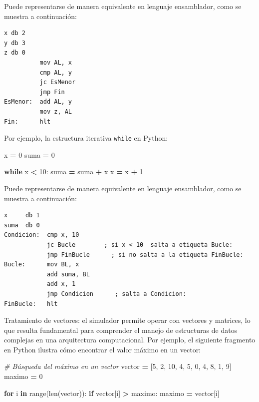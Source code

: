 \documentclass[12pt,oneside]{templates/unerthesis}
\newenvironment{Shaded}{\begin{snugshade}}{\end{snugshade}}
\newcommand{\BuiltInTok}[1]{#1}
\newcommand{\CommentTok}[1]{\textcolor[rgb]{0.56,0.35,0.01}{\textit{#1}}}
\newcommand{\ControlFlowTok}[1]{\textcolor[rgb]{0.13,0.29,0.53}{\textbf{#1}}}
\newcommand{\DecValTok}[1]{\textcolor[rgb]{0.00,0.00,0.81}{#1}}
\newcommand{\KeywordTok}[1]{\textcolor[rgb]{0.13,0.29,0.53}{\textbf{#1}}}
\newcommand{\NormalTok}[1]{#1}
\newcommand{\OperatorTok}[1]{\textcolor[rgb]{0.81,0.36,0.00}{\textbf{#1}}}
\begin{document}
Puede representarse de manera equivalente en lenguaje ensamblador, como se muestra a continuación:

\begin{lstlisting}
x db 2 
y db 3
z db 0
          mov AL, x
          cmp AL, y
          jc EsMenor
          jmp Fin
EsMenor:  add AL, y
          mov z, AL 
Fin:      hlt\end{lstlisting}

Por ejemplo, la estructura iterativa \texttt{while} en Python:

\begin{Shaded}
\begin{Highlighting}[]
\NormalTok{x }\OperatorTok{=} \DecValTok{0}
\NormalTok{suma }\OperatorTok{=} \DecValTok{0}

\ControlFlowTok{while}\NormalTok{ x }\OperatorTok{\textless{}} \DecValTok{10}\NormalTok{:}
\NormalTok{    suma }\OperatorTok{=}\NormalTok{ suma }\OperatorTok{+}\NormalTok{ x}
\NormalTok{    x }\OperatorTok{=}\NormalTok{ x }\OperatorTok{+} \DecValTok{1}
\end{Highlighting}
\end{Shaded}

Puede representarse de manera equivalente en lenguaje ensamblador, como se muestra a continuación:

\begin{lstlisting}
x     db 1   
suma  db 0   
Condicion:  cmp x, 10 
            jc Bucle        ; si x < 10  salta a etiqueta Bucle:
            jmp FinBucle      ; si no salta a la etiqueta FinBucle:
Bucle:      mov BL, x
            add suma, BL
            add x, 1
            jmp Condicion      ; salta a Condicion:
FinBucle:   hlt
\end{lstlisting}

Tratamiento de vectores: el simulador permite operar con vectores y matrices, lo que resulta fundamental para comprender el manejo de estructuras de datos complejas en una arquitectura computacional. Por ejemplo, el siguiente fragmento en Python ilustra cómo encontrar el valor máximo en un vector:

\begin{Shaded}
\begin{Highlighting}[]
\CommentTok{\# Búsqueda del máximo en un vector}
\NormalTok{vector }\OperatorTok{=}\NormalTok{ [}\DecValTok{5}\NormalTok{, }\DecValTok{2}\NormalTok{, }\DecValTok{10}\NormalTok{, }\DecValTok{4}\NormalTok{, }\DecValTok{5}\NormalTok{, }\DecValTok{0}\NormalTok{, }\DecValTok{4}\NormalTok{, }\DecValTok{8}\NormalTok{, }\DecValTok{1}\NormalTok{, }\DecValTok{9}\NormalTok{]}
\NormalTok{maximo }\OperatorTok{=} \DecValTok{0}

\ControlFlowTok{for}\NormalTok{ i }\KeywordTok{in} \BuiltInTok{range}\NormalTok{(}\BuiltInTok{len}\NormalTok{(vector)):}
    \ControlFlowTok{if}\NormalTok{ vector[i] }\OperatorTok{\textgreater{}}\NormalTok{ maximo:}
\NormalTok{        maximo }\OperatorTok{=}\NormalTok{ vector[i]}
\end{Highlighting}
\end{Shaded}
\end{document}
